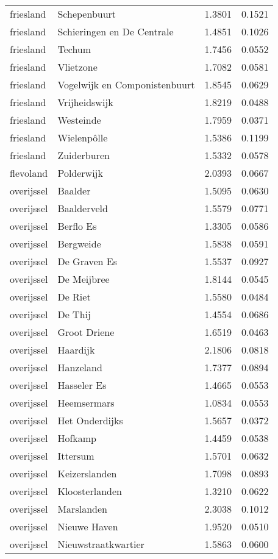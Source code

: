 \begin{longtable}{llcc}
friesland & Schepenbuurt & 1.3801 & 0.1521 \\
friesland & Schieringen en De Centrale & 1.4851 & 0.1026 \\
friesland & Techum & 1.7456 & 0.0552 \\
friesland & Vlietzone & 1.7082 & 0.0581 \\
friesland & Vogelwijk en Componistenbuurt & 1.8545 & 0.0629 \\
friesland & Vrijheidswijk & 1.8219 & 0.0488 \\
friesland & Westeinde & 1.7959 & 0.0371 \\
friesland & Wielenpôlle & 1.5386 & 0.1199 \\
friesland & Zuiderburen & 1.5332 & 0.0578 \\
flevoland & Polderwijk & 2.0393 & 0.0667 \\
overijssel & Baalder & 1.5095 & 0.0630 \\
overijssel & Baalderveld & 1.5579 & 0.0771 \\
overijssel & Berflo Es & 1.3305 & 0.0586 \\
overijssel & Bergweide & 1.5838 & 0.0591 \\
overijssel & De Graven Es & 1.5537 & 0.0927 \\
overijssel & De Meijbree & 1.8144 & 0.0545 \\
overijssel & De Riet & 1.5580 & 0.0484 \\
overijssel & De Thij & 1.4554 & 0.0686 \\
overijssel & Groot Driene & 1.6519 & 0.0463 \\
overijssel & Haardijk & 2.1806 & 0.0818 \\
overijssel & Hanzeland & 1.7377 & 0.0894 \\
overijssel & Hasseler Es & 1.4665 & 0.0553 \\
overijssel & Heemsermars & 1.0834 & 0.0553 \\
overijssel & Het Onderdijks & 1.5657 & 0.0372 \\
overijssel & Hofkamp & 1.4459 & 0.0538 \\
overijssel & Ittersum & 1.5701 & 0.0632 \\
overijssel & Keizerslanden & 1.7098 & 0.0893 \\
overijssel & Kloosterlanden & 1.3210 & 0.0622 \\
overijssel & Marslanden & 2.3038 & 0.1012 \\
overijssel & Nieuwe Haven & 1.9520 & 0.0510 \\
overijssel & Nieuwstraatkwartier & 1.5863 & 0.0600 \\

\end{longtable}
